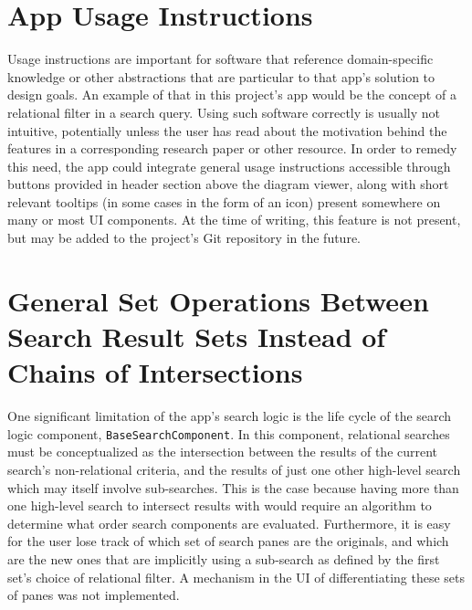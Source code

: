 \documentclass[12pt, letterpaper]{report}
\begin{document}
\section {App Usage Instructions}
Usage instructions are important for software that reference domain-specific knowledge or other abstractions that are particular to that app's solution to design goals. An example of that in this project's app would be the concept of a relational filter in a search query. Using such software correctly is usually not intuitive, potentially unless the user has read about the motivation behind the features in a corresponding research paper or other resource. In order to remedy this need, the app could integrate general usage instructions accessible through buttons provided in header section above the diagram viewer, along with short relevant tooltips (in some cases in the form of an icon) present somewhere on many or most UI components. At the time of writing, this feature is not present, but may be added to the project's Git repository in the future.

\section {General Set Operations Between Search Result Sets Instead of Chains of Intersections}
One significant limitation of the app's search logic is the life cycle of the search logic component, \verb|BaseSearchComponent|. In this component, relational searches must be conceptualized as the intersection between the results of the current search's non-relational criteria, and the results of just one other high-level search which may itself involve sub-searches. This is the case because having more than one high-level search to intersect results with would require an algorithm to determine what order search components are evaluated. Furthermore, it is easy for the user lose track of which set of search panes are the originals, and which are the new ones that are implicitly using a sub-search as defined by the first set's choice of relational filter. A mechanism in the UI of differentiating these sets of panes was not implemented.
\end{document}
